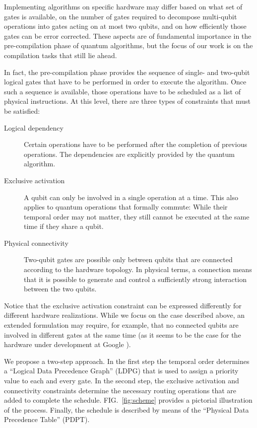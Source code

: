\documentclass[%
onecolumn,pra,
superscriptaddress,
nofootinbib,
 amsmath,amssymb,
 aps,
11pt,
]{revtex4-1}
\begin{document}
Implementing algorithms on specific hardware may differ based on what set of gates is available, on the number of gates required to decompose multi-qubit operations into gates acting on at most two qubits, and on how efficiently those gates can be error corrected. These aspects are of fundamental importance in the pre-compilation phase of quantum algorithms, but the focus of our work is on the compilation tasks that still lie ahead.

In fact, the pre-compilation phase provides the sequence of single- and two-qubit logical gates that have to be performed in order to execute the algorithm. Once such a sequence is available, those operations have to be scheduled as a list of physical instructions. At this level, there are three types of constraints that must be satisfied:
\begin{description}
	\item[Logical dependency] Certain operations have to be performed after the completion of previous operations. The dependencies are explicitly provided by the quantum algorithm.
	\item[Exclusive activation] A qubit can only be involved in a single operation at a time. This also applies to quantum operations that formally commute: While their temporal order may not matter, they still cannot be executed at the same time if they share a qubit.
	\item[Physical connectivity] Two-qubit gates are possible only between qubits that are connected according to the hardware topology. In physical terms, a connection means that it is possible to generate and control a sufficiently strong interaction between the two qubits.
\end{description}

Notice that the exclusive activation constraint can be expressed differently for different hardware realizations. While we focus on the case described above, an extended formulation may require, for example, that no connected qubits are involved in different gates at the same time (as it seems to be the case for the hardware under development at Google \cite{Boixo2016}).

We propose a two-step approach. In the first step the temporal order determines a ``Logical Data Precedence Graph'' (LDPG) that is used to assign a priority value to each and every gate. In the second step, the exclusive activation and connectivity constraints determine the necessary routing operations that are added to complete the schedule. FIG.~\ref{fig:scheme} provides a pictorial illustration of the process. Finally, the schedule is described by means of the ``Physical Data Precedence Table'' (PDPT).
\end{document}
